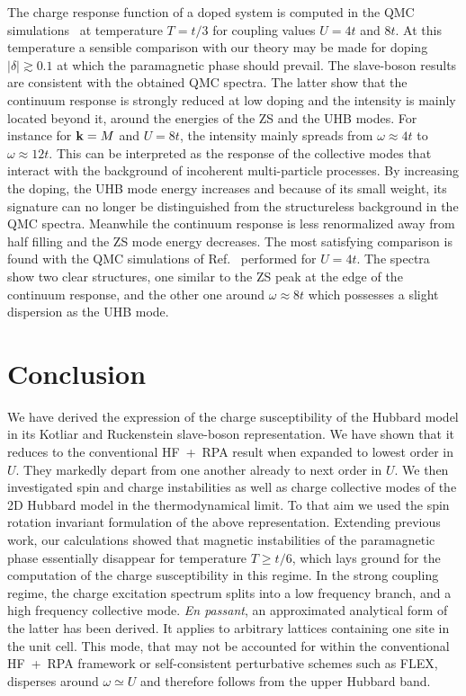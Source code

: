\documentclass[showpacs,amsmath,twocolumn,floatfix]{revtex4-1}
\begin{document}
The charge response function of a doped system is computed in the QMC 
simulations~\cite{Pre97,Gro00,Koh04,Kun15} at temperature $T=t/3$ for coupling 
values $U=4t$ and $8t$. At this temperature a sensible comparison with our 
theory may be made for doping $|\delta| \gtrsim 0.1$ at which the 
paramagnetic phase should prevail. The slave-boson results are consistent 
with the obtained QMC spectra. The latter show that the continuum 
response is strongly reduced at low doping and the intensity is mainly located 
beyond it, around the energies of the ZS and the UHB modes. For instance for 
${\bf k}= M$ and $U=8t$, the intensity mainly spreads from $\omega \approx 4t$ 
to $\omega \approx 12t$. This can be interpreted as the response of the collective 
modes that interact with the background of incoherent multi-particle processes. 
By increasing the doping, the UHB mode energy increases and because of its small 
weight, its signature can no longer be distinguished from the structureless 
background in the QMC spectra. Meanwhile the continuum response is less 
renormalized away from half filling and the ZS mode energy decreases. The most 
satisfying comparison is found with the QMC simulations of Ref.~\cite{Koh04} 
performed for $U=4t$. The spectra show two clear structures, one similar to the 
ZS peak at the edge of the continuum response, and the other one around 
$\omega \approx 8t$ which possesses a slight dispersion as the UHB mode. 

\section{Conclusion} \label{sec:conclusion}


We have derived the expression of the charge susceptibility
of the Hubbard model in its Kotliar and Ruckenstein slave-boson
representation. We have shown that it reduces to the conventional HF~+~RPA
result when expanded to lowest order in $U$. They markedly depart from
one another already to next order in $U$. We then investigated spin and
charge instabilities as well as charge collective modes of the 2D
Hubbard model in the thermodynamical limit. To that aim we used the spin
rotation invariant formulation of the above representation. Extending
previous work, our calculations showed that magnetic instabilities of
the paramagnetic phase essentially disappear for temperature $ T \geq
t/6$, which lays ground for the computation of the charge susceptibility
in this regime. In the strong coupling regime, the charge excitation
spectrum splits into a low frequency branch, and a high frequency
collective mode. \textit{En passant}, an approximated analytical form of
the latter has been derived. It applies to arbitrary lattices containing
one site in the unit cell. This mode, that may not be accounted for
within the conventional HF~+~RPA framework or self-consistent perturbative
schemes such as FLEX, disperses around $\omega \simeq U$ and therefore
follows from the upper Hubbard band.
\end{document}
